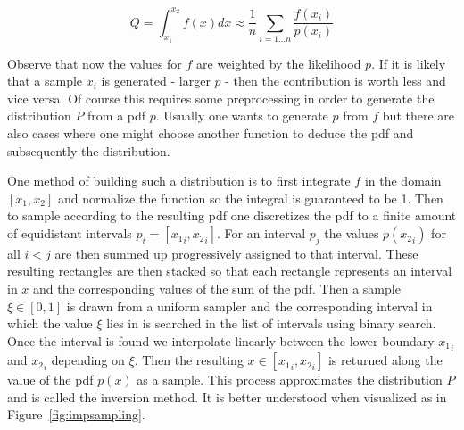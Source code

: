 \documentclass[a4paper,10pt]{article}
\newcommand{\figref}[1]{Figure~\ref{#1}}
\begin{document}
    \begin{equation}
        \label{equ:impsampling}
        Q = \int_{x_1}^{x_2} f(x) dx \approx \frac{1}{n} \sum_{i = 1...n} \frac{f(x_i)}{p(x_i)}
    \end{equation}

    Observe that now the values for $f$ are weighted by the likelihood $p$.
    If it is likely that a sample $x_i$ is generated - larger $p$ - then
    the contribution is worth less and vice versa.     
    Of course this requires some preprocessing in order to generate the
    distribution $P$ from a pdf $p$.
    Usually one wants to generate $p$ from $f$ but there are also 
    cases where one might choose another function to deduce the
    pdf and subsequently the distribution.

    One method of building such a distribution is to first integrate
    $f$ in the domain $[x_1, x_2]$ and normalize the function so the
    integral is guaranteed to be 1.
    Then to sample according to the resulting pdf one discretizes the
    pdf to a finite amount of equidistant intervals $p_i = [{x_1}_i, {x_2}_i]$.
    For an interval $p_j$ the values $p({x_2}_i)$ for all $i < j$ are
    then summed up progressively assigned to that interval.
    These resulting rectangles are then stacked so that each rectangle
    represents an interval in $x$ and the corresponding values of the
    sum of the pdf.
    Then a sample $\xi \in [0,1]$ is drawn from a uniform sampler and
    the corresponding interval in which the value $\xi$ lies in is
    searched in the list of intervals using binary search.
    Once the interval is found we interpolate linearly between the
    lower boundary ${x_1}_i$ and ${x_2}_i$ depending on $\xi$.
    Then the resulting $x \in [{x_1}_i, {x_2}_i]$ is returned along
    the value of the pdf $p(x)$ as a sample.
    This process approximates the distribution $P$ and is called the
    inversion method. It is better understood when visualized as in
    \figref{fig:impsampling}. 
    
\end{document}
